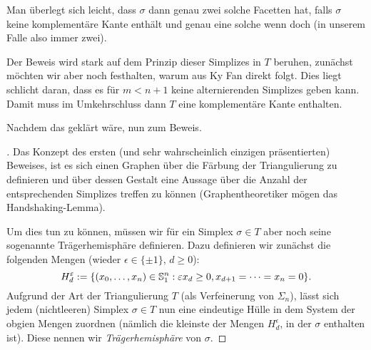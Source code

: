 \documentclass[10pt,a4paper]{article}
\begin{document}
\begin{remark}
Man überlegt sich leicht, dass $\sigma$ dann genau zwei solche Facetten hat, falls $\sigma$ keine komplementäre Kante enthält und genau eine solche wenn doch (in unserem Falle also immer zwei).
\end{remark}

Der Beweis wird stark auf dem Prinzip dieser Simplizes in $T$ beruhen, zunächst möchten wir aber noch festhalten, warum aus Ky Fan direkt  folgt. Dies liegt schlicht daran, dass es für $m<n+1$ keine alternierenden Simplizes geben kann. Damit muss im Umkehrschluss dann $T$ eine komplementäre Kante enthalten.

Nachdem das geklärt wäre, nun zum Beweis.

\begin{proof}[]
Das Konzept des ersten (und sehr wahrscheinlich einzigen präsentierten) Beweises, ist es sich einen Graphen über die Färbung der Triangulierung zu definieren und über dessen Gestalt eine Aussage über die Anzahl der entsprechenden Simplizes treffen zu können (Graphentheoretiker mögen das Handshaking-Lemma).

Um dies tun zu können, müssen wir für ein Simplex $\sigma\in T$ aber noch seine sogenannte Trägerhemisphäre definieren.
Dazu definieren wir zunächst die folgenden Mengen (wieder $\epsilon\in\{\pm1\}$, $d\geq 0$):
\begin{equation}
H^{\varepsilon}_d:=\{(x_0,\ldots,x_n)\in\mathbb{S}^n_1:\varepsilon x_d\geq 0,x_{d+1}=\cdots=x_n=0\}. 
\end{equation}
Aufgrund der Art der Triangulierung $T$ (als Verfeinerung von $\Sigma_n$), lässt sich jedem (nichtleeren) Simplex $\sigma\in T$ nun eine eindeutige Hülle in dem System der obgien Mengen zuordnen (nämlich die kleinste der Mengen $H^{\epsilon}_d$, in der $\sigma$ enthalten ist). Diese nennen wir \emph{Trägerhemisphäre} von $\sigma$.


\end{proof}
\end{document}
